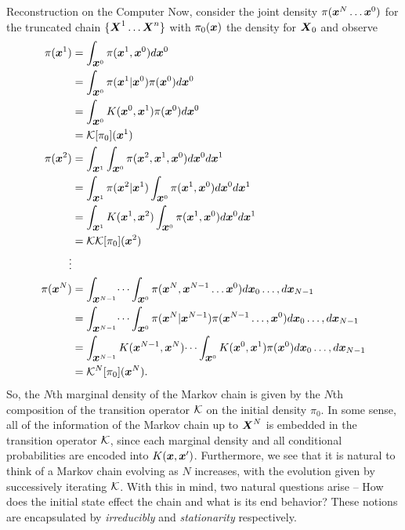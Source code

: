 \begin{chapter}{Reconstruction on the Computer}
Now, consider the joint density $\pi(\mbox{\boldmath$x$}^N\dots \mbox{\boldmath$x$}^0)$ for the truncated chain $\{\mbox{\boldmath$X$}^1\dots \mbox{\boldmath$X$}^n\}$ with $\pi_0(\mbox{\boldmath$x$})$ the density for $\mbox{\boldmath$X$}_0$ and observe 
\begin{align} 
  \pi(\mbox{\boldmath$x$}^1) 
    &= \int_{\mbox{\boldmath$x$}^0} \pi(\mbox{\boldmath$x$}^1,\mbox{\boldmath$x$}^0) d\mbox{\boldmath$x$}^0 \nonumber\\
    &= \int_{\mbox{\boldmath$x$}^0} \pi(\mbox{\boldmath$x$}^1|\mbox{\boldmath$x$}^0)\pi( \mbox{\boldmath$x$}^0) d\mbox{\boldmath$x$}^0 \nonumber\\
    &= \int_{\mbox{\boldmath$x$}^0} K(\mbox{\boldmath$x$}^0,\mbox{\boldmath$x$}^1)\pi( \mbox{\boldmath$x$}^0) d\mbox{\boldmath$x$}^0\nonumber\\
    &= \mathcal K [\pi_0](\mbox{\boldmath$x$}^1) \\
  \pi(\mbox{\boldmath$x$}^2) 
    &= \int_{\mbox{\boldmath$x$}^1}\int_{\mbox{\boldmath$x$}^0} \pi(\mbox{\boldmath$x$}^2,\mbox{\boldmath$x$}^1,\mbox{\boldmath$x$}^0) d\mbox{\boldmath$x$}^0 d\mbox{\boldmath$x$}^1\nonumber\\
    &= \int_{\mbox{\boldmath$x$}^1}\pi(\mbox{\boldmath$x$}^2|\mbox{\boldmath$x$}^1)\int_{\mbox{\boldmath$x$}^0} \pi(\mbox{\boldmath$x$}^1,\mbox{\boldmath$x$}^0) d\mbox{\boldmath$x$}^0 d\mbox{\boldmath$x$}^1\nonumber\\
    &= \int_{\mbox{\boldmath$x$}^1}K(\mbox{\boldmath$x$}^1,\mbox{\boldmath$x$}^2)\int_{\mbox{\boldmath$x$}^0} \pi(\mbox{\boldmath$x$}^1,\mbox{\boldmath$x$}^0) d\mbox{\boldmath$x$}^0 d\mbox{\boldmath$x$}^1\nonumber\\
    &= \mathcal K  \mathcal K [\pi_0](\mbox{\boldmath$x$}^2)\\
    \vdots\nonumber\\
  \pi(\mbox{\boldmath$x$}^N)  
    &= \int_{\mbox{\boldmath$x$}^{N-1}}\dots\int_{\mbox{\boldmath$x$}^0} \pi(\mbox{\boldmath$x$}^N, \mbox{\boldmath$x$}^{N-1}\dots \mbox{\boldmath$x$}^0)d\mbox{\boldmath$x$}_0\dots,d\mbox{\boldmath$x$}_{N-1}\nonumber\\
    &= \int_{\mbox{\boldmath$x$}^{N-1}}\dots\int_{\mbox{\boldmath$x$}^0} \pi(\mbox{\boldmath$x$}^N| \mbox{\boldmath$x$}^{N-1})\pi(\mbox{\boldmath$x$}^{N-1}\dots,\mbox{\boldmath$x$}^0)d\mbox{\boldmath$x$}_0\dots,d\mbox{\boldmath$x$}_{N-1} \nonumber\\
    &= \int_{\mbox{\boldmath$x$}^{N-1}}K( \mbox{\boldmath$x$}^{N-1},\mbox{\boldmath$x$}^N)\dots\int_{\mbox{\boldmath$x$}^0} K(\mbox{\boldmath$x$}^0,\mbox{\boldmath$x$}^1)\pi(\mbox{\boldmath$x$}^0)d\mbox{\boldmath$x$}_0\dots,d\mbox{\boldmath$x$}_{N-1} \nonumber\\
    &= \mathcal K^N [\pi_0](\mbox{\boldmath$x$}^N).
\end{align}
So, the $N$th marginal density of the Markov chain is given by the $N$th composition of the transition operator $\mathcal K$ on the initial density $\pi_0$.
In some sense, all of the information of the Markov chain up to $\mbox{\boldmath$X$}^N$ is embedded in the transition operator $\mathcal K$, since each marginal density and all conditional probabilities are encoded into $K(\mbox{\boldmath$x$}, \mbox{\boldmath$x$}')$.
Furthermore, we see that it is natural to think of a Markov chain evolving as $N$ increases, with the evolution given by successively iterating $\mathcal K$.
With this in mind, two natural questions arise -- How does the initial state effect the chain and what is its end behavior? 
These notions are encapsulated by \emph{irreducibly} and \emph{stationarity} respectively.


\end{chapter}
